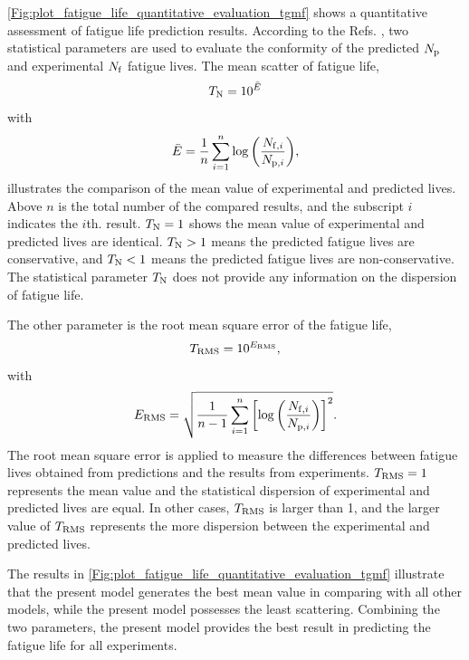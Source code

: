 \documentclass[preprint,5p,twocolumn,11pt,sort&compress]{elsarticle}
\begin{document}
\autoref{Fig:plot_fatigue_life_quantitative_evaluation_tgmf} shows a quantitative assessment of fatigue life prediction results. According to the Refs. \cite{KAROLCZUK201439,WALAT201473,SKIBICKI201718}, two statistical parameters are used to evaluate the conformity of the predicted $N_{\rm p}$ and experimental $N_{\rm f}$ fatigue lives. The mean scatter of fatigue life,
\begin{equation}
{T_{\rm N}} = {10^{\bar E}}
\label{Equ:TN}
\end{equation}
with
\begin{equation}
\bar E = \frac{1}{n}\sum\limits_{i = 1}^n {\log \left( {\frac{{{N_{{\rm f},i}}}}{{{N_{{\rm p},i}}}}} \right)},
\end{equation}
illustrates the comparison of the mean value of experimental and predicted lives. Above $n$ is the total number of the compared results, and the subscript $i$ indicates the $i$th. result. $T_{\rm N} = 1$ shows the mean value of experimental and predicted lives are identical. $T_{\rm N} > 1$ means the predicted fatigue lives are conservative, and $T_{\rm N} < 1$ means the predicted fatigue lives are non-conservative. The statistical parameter $T_{\rm N}$ does not provide any information on the dispersion of fatigue life.

The other parameter is the root mean square error of the fatigue life,
\begin{equation}
{T_{\rm RMS}} = {10^{{E_{\rm RMS}}}},
\label{Equ:TRMS}
\end{equation}
with
\begin{equation}
{E_{\rm RMS}} = \sqrt {\frac{1}{n-1}\sum\limits_{i = 1}^n {\left[{{\log }}\left( {\frac{{{N_{{\rm f},i}}}}{{{N_{{\rm p},i}}}}} \right) \right]^2}}.
\end{equation}
The root mean square error is applied to measure the differences between fatigue lives obtained from predictions and the results from experiments. $T_{\rm RMS} = 1$ represents the mean value and the statistical dispersion of experimental and predicted lives are equal. In other cases, $T_{\rm RMS}$ is larger than 1, and the larger value of $T_{\rm RMS}$ represents the more dispersion between the experimental and predicted lives.

The results in \autoref{Fig:plot_fatigue_life_quantitative_evaluation_tgmf} illustrate that the present model generates the best mean value in comparing with all other models, while the present model possesses the least scattering. Combining the two parameters, the present model provides the best result in predicting the fatigue life for all experiments.
\end{document}
